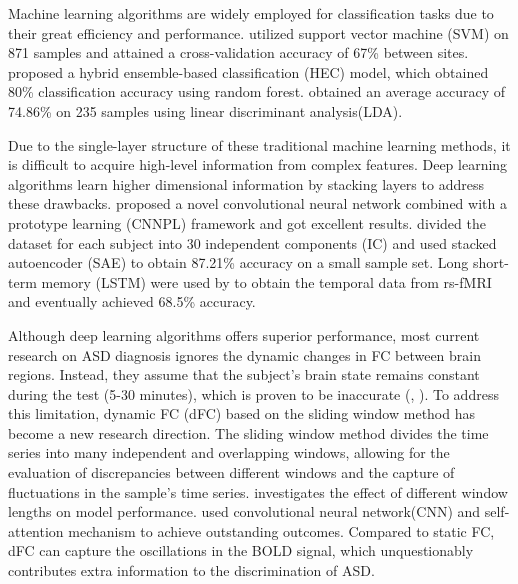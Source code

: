 \documentclass[a4paper]{cas-dc}
\begin{document}
Machine learning algorithms are widely employed for classification tasks due to their great efficiency and performance. \cite{abraham2017deriving} utilized support vector machine (SVM) on 871 samples and attained a cross-validation accuracy of 67\% between sites. \cite{ismail2022hec} proposed a hybrid ensemble-based classification (HEC) model, which obtained 80\% classification accuracy using random forest. \cite{song2019characterizing} obtained an average accuracy of 74.86\% on 235 samples using linear discriminant analysis(LDA).

Due to the single-layer structure of these traditional machine learning methods, it is difficult to acquire high-level information from complex features. Deep learning algorithms learn higher dimensional information by stacking layers to address these drawbacks. \cite{liang2021convolutional} proposed a novel convolutional neural network combined with a prototype learning (CNNPL) framework and got excellent results. \cite{xiao2018sae} divided the dataset for each subject into 30 independent components (IC) and used stacked autoencoder (SAE) to obtain 87.21\% accuracy on a small sample set. Long short-term memory (LSTM) were used by \cite{dvornek2017identifying} to obtain the temporal data from rs-fMRI and eventually achieved 68.5\% accuracy.

Although deep learning algorithms offers superior performance, most current research on ASD diagnosis ignores the dynamic changes in FC between brain regions. Instead, they assume that the subject's brain state remains constant during the test (5-30 minutes), which is proven to be inaccurate (\cite{calhoun2014chronnectome}, \cite{allen2014tracking}). To address this limitation, dynamic FC (dFC) based on the sliding window method has become a new research direction. The sliding window method divides the time series into many independent and overlapping windows, allowing for the evaluation of discrepancies between different windows and the capture of fluctuations in the sample's time series. \cite{savva2019assessment} investigates the effect of different window lengths on model performance. \cite{litjens2017survey} used convolutional neural network(CNN) and self-attention mechanism to achieve outstanding outcomes. Compared to static FC, dFC can capture the oscillations in the BOLD signal, which unquestionably contributes extra information to the discrimination of ASD.

\end{document}
